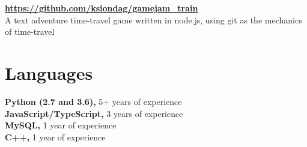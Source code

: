 \documentclass{res}
\begin{document}
\begin{resume}
  \vspace{-5pt}
  {\bf \url{https://github.com/ksiondag/gamejam_train}}\\
  A text adventure time-travel game written in node.js, using git as the mechanics of time-travel
\vspace{0.1in}

  
\section{Languages} 
\vspace{0.1in}
  {\bf Python (2.7 and 3.6),} 5+ years of experience\\
  {\bf JavaScript/TypeScript,} 3 years of experience\\
  {\bf MySQL,} 1 year of experience\\
  {\bf C++,} 1 year of experience    
 
\end{resume}
\end{document}
